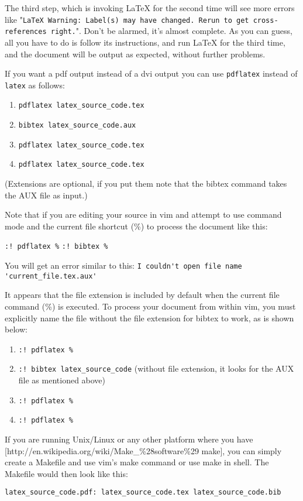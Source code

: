 The third step, which is invoking LaTeX for the second time will see more errors like "\verb|LaTeX Warning: Label(s) may have changed. Rerun to get cross-references right.|". Don't be alarmed, it's almost complete. As you can guess, all you have to do is follow its instructions, and run LaTeX for the third time, and the document will be output as expected, without further problems.

If you want a pdf output instead of a dvi output you can use \verb|pdflatex| instead of \verb|latex| as follows:
\begin{enumerate}
\item \verb|pdflatex latex_source_code.tex|
\item \verb|bibtex latex_source_code.aux|
\item \verb|pdflatex latex_source_code.tex|
\item \verb|pdflatex latex_source_code.tex|
\end{enumerate}
(Extensions are optional, if you put them note that the bibtex command takes the AUX file as input.)

Note that if you are editing your source in vim and attempt to use command mode
and the current file shortcut (\%) to process the document like this:

\verb|:! pdflatex %|
\verb|:! bibtex %|

You will get an error similar to this:  
\verb|I couldn't open file name 'current_file.tex.aux'|

It appears that the file extension is included by default when the current file
command (\%) is executed.  To process your document from within vim, you must
explicitly name the file without the file extension for bibtex to work, as is
shown below:
\begin{enumerate}
\item \verb|:! pdflatex %|
\item \verb|:! bibtex latex_source_code| (without file extension, it looks for the AUX file as mentioned above)
\item \verb|:! pdflatex %|
\item \verb|:! pdflatex %|
\end{enumerate}

If you are running Unix/Linux or any other platform where you have
[http://en.wikipedia.org/wiki/Make\_\%28software\%29 make], you can simply
create a Makefile and use vim's make command or use make in shell. The Makefile
would then look like this:

\verb|latex_source_code.pdf: latex_source_code.tex latex_source_code.bib|


